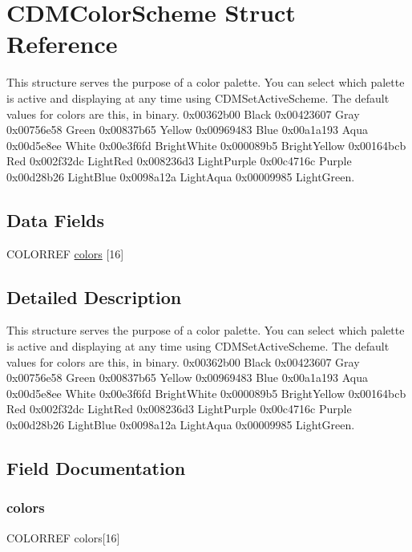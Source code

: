 \hypertarget{struct_c_d_m_color_scheme}{}\section{C\+D\+M\+Color\+Scheme Struct Reference}
\label{struct_c_d_m_color_scheme}


This structure serves the purpose of a color palette. You can select which palette is active and displaying at any time using C\+D\+M\+Set\+Active\+Scheme. The default values for colors are this, in binary. 0x00362b00 Black 0x00423607 Gray 0x00756e58 Green 0x00837b65 Yellow 0x00969483 Blue 0x00a1a193 Aqua 0x00d5e8ee White 0x00e3f6fd Bright\+White 0x000089b5 Bright\+Yellow 0x00164bcb Red 0x002f32dc Light\+Red 0x008236d3 Light\+Purple 0x00c4716c Purple 0x00d28b26 Light\+Blue 0x0098a12a Light\+Aqua 0x00009985 Light\+Green.  


\subsection*{Data Fields}
\begin{DoxyCompactItemize}
\item 
C\+O\+L\+O\+R\+R\+EF \mbox{\hyperlink{struct_c_d_m_color_scheme_a5b8477f088551d8fc001899358e29a43}{colors}} \mbox{[}16\mbox{]}
\end{DoxyCompactItemize}


\subsection{Detailed Description}
This structure serves the purpose of a color palette. You can select which palette is active and displaying at any time using C\+D\+M\+Set\+Active\+Scheme. The default values for colors are this, in binary. 0x00362b00 Black 0x00423607 Gray 0x00756e58 Green 0x00837b65 Yellow 0x00969483 Blue 0x00a1a193 Aqua 0x00d5e8ee White 0x00e3f6fd Bright\+White 0x000089b5 Bright\+Yellow 0x00164bcb Red 0x002f32dc Light\+Red 0x008236d3 Light\+Purple 0x00c4716c Purple 0x00d28b26 Light\+Blue 0x0098a12a Light\+Aqua 0x00009985 Light\+Green. 

\subsection{Field Documentation}
\mbox{\label{struct_c_d_m_color_scheme_a5b8477f088551d8fc001899358e29a43}} 
\subsubsection{\texorpdfstring{colors}{colors}}
{\footnotesize\ttfamily C\+O\+L\+O\+R\+R\+EF colors\mbox{[}16\mbox{]}}

